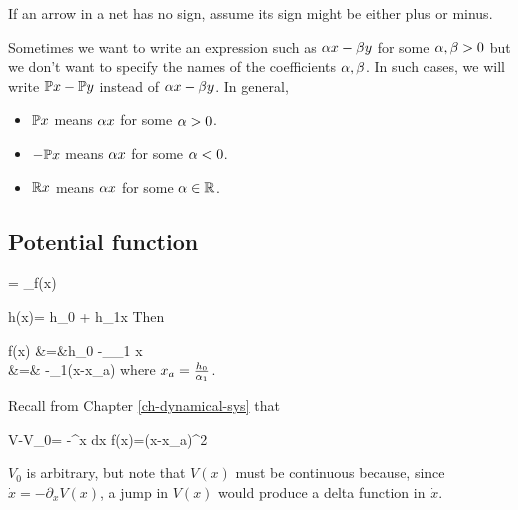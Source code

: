 If an arrow in a net has no sign, assume its sign 
might be either plus or minus.

Sometimes we want to write an expression
such as $\alpha x -\beta y$ for some $\alpha, \beta>0$ but we don't want to specify
the names of the coefficients $\alpha, \beta$.
In such cases, we will write ${ \mathbb{P}} x -{ \mathbb{P}} y$
instead of $\alpha x -\beta y$. In general,
\begin{itemize}
\item
${ \mathbb{P}} x$ means $\alpha x$ for some $\alpha>0$.
\item
$-{ \mathbb{P}} x$ means $\alpha x$ for some $\alpha<0$.
\item
${ \mathbb{R}} x$ means $\alpha x$ for some $\alpha\in { \mathbb{R}}$.
\end{itemize}

\subsection{Potential function}

\beq
{} = _{f(x)}
\eeq

\beq
h(x)= h_0 + h_1x
\eeq
Then

\beqa
f(x)
&=&h_0
-_{\alp_1} x
\\
&=&
-\alp_1(x-x_a)
\eeqa
where
$x_a = \frac{h_0}{\alpha_1}$.

Recall from Chapter \ref{ch-dynamical-sys}
that


\beq
V-V_0= -\int^x dx\; f(x)=(x-x_a)^2
\eeq

$V_0$ is arbitrary, but note that $V(x)$ must be continuous
because, since $\dot{x}=-\partial_xV(x)$, a jump in $V(x)$
would produce a delta function in $\dot{x} $.

